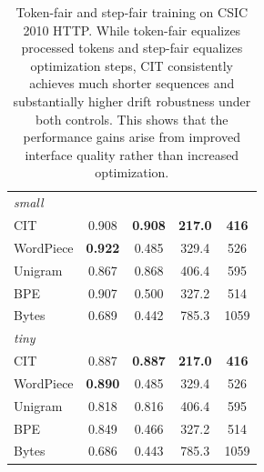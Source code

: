 \begin{table}[t]
\begin{minipage}[t]{0.49\textwidth}
\begin{tabular*}{\linewidth}{@{\extracolsep{\fill}}lcccc@{}}
\multicolumn{5}{l}{\textit{small}}\\
CIT        & 0.908 & \textbf{0.908} & \textbf{217.0} & \textbf{416} \\
WordPiece  & \textbf{0.922} & 0.485 & 329.4 & 526 \\
Unigram    & 0.867 & 0.868 & 406.4 & 595 \\
BPE        & 0.907 & 0.500 & 327.2 & 514 \\
Bytes      & 0.689 & 0.442 & 785.3 & 1059 \\
\midrule
\multicolumn{5}{l}{\textit{tiny}}\\
CIT        & 0.887 & \textbf{0.887} & \textbf{217.0} & \textbf{416} \\
WordPiece  & \textbf{0.890} & 0.485 & 329.4 & 526 \\
Unigram    & 0.818 & 0.816 & 406.4 & 595 \\
BPE        & 0.849 & 0.466 & 327.2 & 514 \\
Bytes      & 0.686 & 0.443 & 785.3 & 1059 \\
\bottomrule
\end{tabular*}
\end{minipage}
\caption{Token-fair and step-fair training on CSIC 2010 HTTP. While token-fair equalizes processed tokens and step-fair equalizes optimization steps, CIT consistently achieves much shorter sequences and substantially higher drift robustness under both controls. This shows that the performance gains arise from improved interface quality rather than increased optimization.}

\label{tab:e2_csic_controls}
\end{table}
